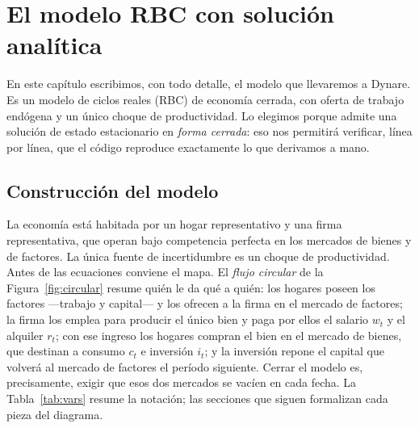 \documentclass[11pt,a4paper]{report}
\begin{document}
\chapter{El modelo RBC con solución analítica}
\label{ch:modelo}

En este capítulo escribimos, con todo detalle, el modelo que llevaremos a
Dynare. Es un modelo de ciclos reales (RBC) de economía cerrada, con oferta de
trabajo endógena y un único choque de productividad. Lo elegimos porque admite
una solución de estado estacionario en \emph{forma cerrada}: eso nos permitirá
verificar, línea por línea, que el código reproduce exactamente lo que
derivamos a mano.

\section{Construcción del modelo}
\label{sec:modelconstruct}

La economía está habitada por un hogar representativo y una firma representativa,
que operan bajo competencia perfecta en los mercados de bienes y de factores. La
única fuente de incertidumbre es un choque de productividad. Antes de las ecuaciones
conviene el mapa. El \emph{flujo circular} de la Figura~\ref{fig:circular} resume
quién le da qué a quién: los hogares poseen los factores ---trabajo y capital--- y los
ofrecen a la firma en el mercado de factores; la firma los emplea para producir el
único bien y paga por ellos el salario $w_t$ y el alquiler $r_t$; con ese ingreso los
hogares compran el bien en el mercado de bienes, que destinan a consumo $c_t$ e
inversión $i_t$; y la inversión repone el capital que volverá al mercado de factores
el período siguiente. Cerrar el modelo es, precisamente, exigir que esos dos mercados
se vacíen en cada fecha. La Tabla~\ref{tab:vars} resume la notación; las secciones que
siguen formalizan cada pieza del diagrama.
\end{document}
